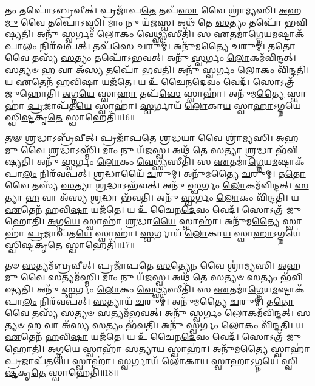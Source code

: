    𑌤𑌂 𑌤𑌪𑍋॑𑌽𑌬𑍍𑌰𑌵𑍀𑌤𑍍।
   𑌪𑍍𑌰𑌜𑌾᳴𑌪\-\ul{𑌤𑍇} 𑌤𑌪᳴\-\ul{𑌸𑌾} 𑌵𑍈 𑌶𑍍𑌰𑌾॑𑌮𑍍𑌯𑌸𑌿।
   \ul{𑌅}\-𑌹\-\ul{𑌮𑍁} 𑌵𑍈 𑌤𑌪𑍋॑𑌽𑌸𑍍𑌮𑌿।
   𑌮𑌾𑌂 𑌨𑍁 𑌯᳴𑌜𑌸𑍍𑌵।
   𑌅𑌥᳴ 𑌤𑍇 \ul{𑌸}\-𑌤𑍍𑌯𑌂 𑌤𑌪𑍋᳴ 𑌭𑌵𑌿𑌷𑍍𑌯𑌤𑌿।
   𑌅𑌨𑍁᳴ \ul{𑌸𑍍𑌵}\-𑌰𑍍𑌗𑌂 \ul{𑌲𑍋}\-𑌕𑌂 \ul{𑌵𑍇}\-𑌥𑍍𑌸𑍍𑌯𑌸𑍀𑌤𑌿᳴।
   𑌸 \ul{𑌏}\-𑌤𑌮𑌾॑\-\ul{𑌗𑍍𑌨𑍇}\-𑌯\-\ul{𑌮}\-𑌷𑍍𑌟𑌾𑌕᳴𑌪𑌾\-\ul{𑌲𑌂} 𑌨𑌿𑌰᳴𑌵𑌪𑌤𑍍।
   𑌤𑌪᳴𑌸𑍇 \ul{𑌚}\-𑌰𑍁𑌮𑍍।
   𑌅𑌨𑍁᳴𑌮𑌤𑍍𑌯𑍈 \ul{𑌚}\-𑌰𑍁𑌮𑍍।
   𑌤\-\ul{𑌤𑍋} 𑌵𑍈 𑌤𑌸𑍍𑌯᳴ \ul{𑌸}\-𑌤𑍍𑌯𑌂 𑌤𑌪𑍋᳴𑌽𑌭𑌵𑌤𑍍।
   𑌅𑌨𑍁᳴ \ul{𑌸𑍍𑌵}\-𑌰𑍍𑌗𑌂 \ul{𑌲𑍋}\-𑌕𑌮᳴𑌵𑌿𑌨𑍍𑌦𑌤𑍍।
   \ul{𑌸}\-𑌤𑍍𑌯𑍞 \ul{𑌹} 𑌵𑌾 𑌅᳴\-\ul{𑌸𑍍𑌯} 𑌤𑌪𑍋᳴ 𑌭𑌵𑌤𑌿।
   𑌅𑌨𑍁᳴ \ul{𑌸𑍍𑌵}\-𑌰𑍍𑌗𑌂 \ul{𑌲𑍋}\-𑌕𑌂 𑌵𑌿᳴𑌨𑍍𑌦𑌤𑌿।
   𑌯 \ul{𑌏}\-𑌤𑍇𑌨᳴ \ul{𑌹}\-𑌵𑌿\-\ul{𑌷𑌾} 𑌯𑌜᳴𑌤𑍇।
   𑌯 𑌉᳴ 𑌚𑍈𑌨\-\ul{𑌦𑍇}\-𑌵𑌂 𑌵𑍇𑌦᳴।
   𑌸𑍋𑌽𑌤𑍍𑌰᳴ 𑌜𑍁𑌹𑍋𑌤𑌿।
   \ul{𑌅}\-𑌗𑍍𑌨\-\ul{𑌯𑍇} 𑌸𑍍𑌵𑌾\-\ul{𑌹𑌾} 𑌤𑌪᳴\-\ul{𑌸𑍇} 𑌸𑍍𑌵𑌾𑌹𑌾॑।
   𑌅𑌨𑍁᳴𑌮\-\ul{𑌤𑍍𑌯𑍈} 𑌸𑍍𑌵𑌾𑌹𑌾॑ \ul{𑌪𑍍𑌰}\-𑌜𑌾𑌪᳴𑌤\-\ul{𑌯𑍇} 𑌸𑍍𑌵𑌾𑌹𑌾॑।
   \ul{𑌸𑍍𑌵}\-𑌰𑍍𑌗𑌾𑌯᳴ \ul{𑌲𑍋}\-𑌕𑌾\-\ul{𑌯} 𑌸𑍍𑌵𑌾\-\ul{𑌹𑌾}\-𑌽𑌗𑍍𑌨𑌯𑍇॑ 𑌸𑍍𑌵𑌿\-\ul{𑌷𑍍𑌟}\-𑌕𑍃\-\ul{𑌤𑍇} 𑌸𑍍𑌵𑌾𑌹𑍇𑌤𑌿᳴॥16॥

   𑌤𑍟 \ul{𑌶𑍍𑌰}\-𑌦𑍍𑌧𑌾𑌽𑌬𑍍𑌰᳴𑌵𑍀𑌤𑍍।
   𑌪𑍍𑌰𑌜𑌾᳴𑌪𑌤𑍇 \ul{𑌶𑍍𑌰}\-𑌦𑍍𑌧\-\ul{𑌯𑌾} 𑌵𑍈 𑌶𑍍𑌰𑌾॑𑌮𑍍𑌯𑌸𑌿।
   \ul{𑌅}\-𑌹\-\ul{𑌮𑍁} 𑌵𑍈 \ul{𑌶𑍍𑌰}\-𑌦𑍍𑌧𑌾𑌽𑌸𑍍𑌮𑌿᳴।
   𑌮𑌾𑌂 𑌨𑍁 𑌯᳴𑌜𑌸𑍍𑌵।
   𑌅𑌥᳴ 𑌤𑍇 \ul{𑌸}\-𑌤𑍍𑌯𑌾 \ul{𑌶𑍍𑌰}\-𑌦𑍍𑌧𑌾 𑌭᳴𑌵𑌿𑌷𑍍𑌯𑌤𑌿।
   𑌅𑌨𑍁᳴ \ul{𑌸𑍍𑌵}\-𑌰𑍍𑌗𑌂 \ul{𑌲𑍋}\-𑌕𑌂 \ul{𑌵𑍇}\-𑌥𑍍𑌸𑍍𑌯𑌸𑍀𑌤𑌿᳴।
   𑌸 \ul{𑌏}\-𑌤𑌮𑌾॑\-\ul{𑌗𑍍𑌨𑍇}\-𑌯\-\ul{𑌮}\-𑌷𑍍𑌟𑌾𑌕᳴𑌪𑌾\-\ul{𑌲𑌂} 𑌨𑌿𑌰᳴𑌵𑌪𑌤𑍍।
   \ul{𑌶𑍍𑌰}\-𑌦𑍍𑌧𑌾𑌯𑍈᳴ \ul{𑌚}\-𑌰𑍁𑌮𑍍।
   𑌅𑌨𑍁᳴𑌮𑌤𑍍𑌯𑍈 \ul{𑌚}\-𑌰𑍁𑌮𑍍।
   𑌤\-\ul{𑌤𑍋} 𑌵𑍈 𑌤𑌸𑍍𑌯᳴ \ul{𑌸}\-𑌤𑍍𑌯𑌾 \ul{𑌶𑍍𑌰}\-𑌦𑍍𑌧𑌾𑌽𑌭᳴𑌵𑌤𑍍।
   𑌅𑌨𑍁᳴ \ul{𑌸𑍍𑌵}\-𑌰𑍍𑌗𑌂 \ul{𑌲𑍋}\-𑌕𑌮᳴𑌵𑌿𑌨𑍍𑌦𑌤𑍍।
   \ul{𑌸}\-𑌤𑍍𑌯𑌾 \ul{𑌹} 𑌵𑌾 𑌅᳴𑌸𑍍𑌯 \ul{𑌶𑍍𑌰}\-𑌦𑍍𑌧𑌾 𑌭᳴𑌵𑌤𑌿।
   𑌅𑌨𑍁᳴ \ul{𑌸𑍍𑌵}\-𑌰𑍍𑌗𑌂 \ul{𑌲𑍋}\-𑌕𑌂 𑌵𑌿᳴𑌨𑍍𑌦𑌤𑌿।
   𑌯 \ul{𑌏}\-𑌤𑍇𑌨᳴ \ul{𑌹}\-𑌵𑌿\-\ul{𑌷𑌾} 𑌯𑌜᳴𑌤𑍇।
   𑌯 𑌉᳴ 𑌚𑍈𑌨\-\ul{𑌦𑍇}\-𑌵𑌂 𑌵𑍇𑌦᳴।
   𑌸𑍋𑌽𑌤𑍍𑌰᳴ 𑌜𑍁𑌹𑍋𑌤𑌿।
   \ul{𑌅}\-𑌗𑍍𑌨\-\ul{𑌯𑍇} 𑌸𑍍𑌵𑌾𑌹𑌾॑ \ul{𑌶𑍍𑌰}\-𑌦𑍍𑌧𑌾\-\ul{𑌯𑍈} 𑌸𑍍𑌵𑌾𑌹𑌾॑।
   𑌅𑌨𑍁᳴𑌮\-\ul{𑌤𑍍𑌯𑍈} 𑌸𑍍𑌵𑌾𑌹𑌾॑ \ul{𑌪𑍍𑌰}\-𑌜𑌾𑌪᳴𑌤\-\ul{𑌯𑍇} 𑌸𑍍𑌵𑌾𑌹𑌾॑।
   \ul{𑌸𑍍𑌵}\-𑌰𑍍𑌗𑌾𑌯᳴ \ul{𑌲𑍋}\-𑌕𑌾\-\ul{𑌯} 𑌸𑍍𑌵𑌾\-\ul{𑌹𑌾}\-𑌽𑌗𑍍𑌨𑌯𑍇॑ 𑌸𑍍𑌵𑌿\-\ul{𑌷𑍍𑌟}\-𑌕𑍃\-\ul{𑌤𑍇} 𑌸𑍍𑌵𑌾𑌹𑍇𑌤𑌿᳴॥17॥

   𑌤𑍞 \ul{𑌸}\-𑌤𑍍𑌯𑌮᳴𑌬𑍍𑌰𑌵𑍀𑌤𑍍।
   𑌪𑍍𑌰𑌜𑌾᳴𑌪𑌤𑍇 \ul{𑌸}\-𑌤𑍍𑌯𑍇\-\ul{𑌨} 𑌵𑍈 𑌶𑍍𑌰𑌾॑𑌮𑍍𑌯𑌸𑌿।
   \ul{𑌅}\-𑌹\-\ul{𑌮𑍁} 𑌵𑍈 \ul{𑌸}\-𑌤𑍍𑌯𑌮᳴𑌸𑍍𑌮𑌿।
   𑌮𑌾𑌂 𑌨𑍁 𑌯᳴𑌜𑌸𑍍𑌵।
   𑌅𑌥᳴ 𑌤𑍇 \ul{𑌸}\-𑌤𑍍𑌯𑍞 \ul{𑌸}\-𑌤𑍍𑌯𑌂 𑌭᳴𑌵𑌿𑌷𑍍𑌯𑌤𑌿।
   𑌅𑌨𑍁᳴ \ul{𑌸𑍍𑌵}\-𑌰𑍍𑌗𑌂 \ul{𑌲𑍋}\-𑌕𑌂 \ul{𑌵𑍇}\-𑌥𑍍𑌸𑍍𑌯𑌸𑍀𑌤𑌿᳴।
   𑌸 \ul{𑌏}\-𑌤𑌮𑌾॑\-\ul{𑌗𑍍𑌨𑍇}\-𑌯\-\ul{𑌮}\-𑌷𑍍𑌟𑌾𑌕᳴𑌪𑌾\-\ul{𑌲𑌂} 𑌨𑌿𑌰᳴𑌵𑌪𑌤𑍍।
   \ul{𑌸}\-𑌤𑍍𑌯𑌾𑌯᳴ \ul{𑌚}\-𑌰𑍁𑌮𑍍।
   𑌅𑌨𑍁᳴𑌮𑌤𑍍𑌯𑍈 \ul{𑌚}\-𑌰𑍁𑌮𑍍।
   𑌤\-\ul{𑌤𑍋} 𑌵𑍈 𑌤𑌸𑍍𑌯᳴ \ul{𑌸}\-𑌤𑍍𑌯𑍞 \ul{𑌸}\-𑌤𑍍𑌯𑌮᳴𑌭𑌵𑌤𑍍।
   𑌅𑌨𑍁᳴ \ul{𑌸𑍍𑌵}\-𑌰𑍍𑌗𑌂 \ul{𑌲𑍋}\-𑌕𑌮᳴𑌵𑌿𑌨𑍍𑌦𑌤𑍍।
   𑌸𑌤𑍍𑌯𑍞 \ul{𑌹} 𑌵𑌾 𑌅᳴𑌸𑍍𑌯 \ul{𑌸}\-𑌤𑍍𑌯𑌂 𑌭᳴𑌵𑌤𑌿।
   𑌅𑌨𑍁᳴ \ul{𑌸𑍍𑌵}\-𑌰𑍍𑌗𑌂 \ul{𑌲𑍋}\-𑌕𑌂 𑌵𑌿᳴𑌨𑍍𑌦𑌤𑌿।
   𑌯 \ul{𑌏}\-𑌤𑍇𑌨᳴ \ul{𑌹}\-𑌵𑌿\-\ul{𑌷𑌾} 𑌯𑌜᳴𑌤𑍇।
   𑌯 𑌉᳴ 𑌚𑍈𑌨\-\ul{𑌦𑍇}\-𑌵𑌂 𑌵𑍇𑌦᳴।
   𑌸𑍋𑌽𑌤𑍍𑌰᳴ 𑌜𑍁𑌹𑍋𑌤𑌿।
   \ul{𑌅}\-𑌗𑍍𑌨\-\ul{𑌯𑍇} 𑌸𑍍𑌵𑌾𑌹𑌾᳴ \ul{𑌸}\-𑌤𑍍𑌯𑌾\-\ul{𑌯} 𑌸𑍍𑌵𑌾𑌹𑌾॑।
   𑌅𑌨𑍁᳴𑌮\-\ul{𑌤𑍍𑌯𑍈} 𑌸𑍍𑌵𑌾𑌹𑌾॑ \ul{𑌪𑍍𑌰}\-𑌜𑌾𑌪᳴𑌤\-\ul{𑌯𑍇} 𑌸𑍍𑌵𑌾𑌹𑌾॑।
   \ul{𑌸𑍍𑌵}\-𑌰𑍍𑌗𑌾𑌯᳴ \ul{𑌲𑍋}\-𑌕𑌾\-\ul{𑌯} 𑌸𑍍𑌵𑌾\-\ul{𑌹𑌾}\-𑌽𑌗𑍍𑌨𑌯𑍇॑ 𑌸𑍍𑌵𑌿\-\ul{𑌷𑍍𑌟}\-𑌕𑍃\-\ul{𑌤𑍇} 𑌸𑍍𑌵𑌾𑌹𑍇𑌤𑌿᳴॥18॥

